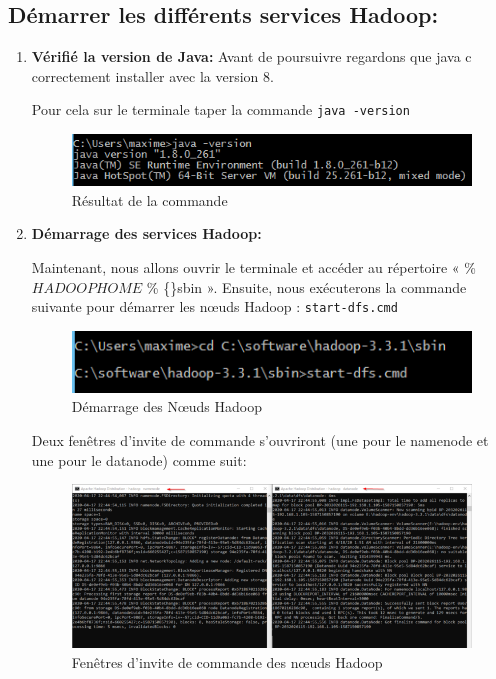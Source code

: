 \subsection{Démarrer les différents services Hadoop:}

\begin{enumerate}
\item \textbf{Vérifié la version de Java:} Avant de poursuivre regardons que java c correctement installer avec la version 8.

Pour cela sur le terminale taper la commande \texttt{java -version}

\begin{figure}[h]
	\centering
    \includegraphics[scale=0.6]{img/part3/3.1}
    \caption{Résultat de la commande}
\end{figure}

\item \textbf{Démarrage des services Hadoop: }

Maintenant, nous allons ouvrir le terminale et accéder au répertoire « \% $HADOOP HOME$ \% \{\}sbin ». Ensuite, nous exécuterons la commande suivante pour démarrer les nœuds Hadoop : \texttt{start-dfs.cmd}
\begin{figure}[h]
	\centering
    \includegraphics[scale=0.6]{img/part3/3.2}
    \caption{Démarrage des Nœuds Hadoop}
\end{figure}

Deux fenêtres d'invite de commande s'ouvriront (une pour le namenode et une pour le datanode) comme suit:
\begin{figure}[h]
	\centering
    \includegraphics[scale=0.4]{img/part3/3.3}
    \caption{ Fenêtres d'invite de commande des nœuds Hadoop}
\end{figure}


\end{enumerate}
